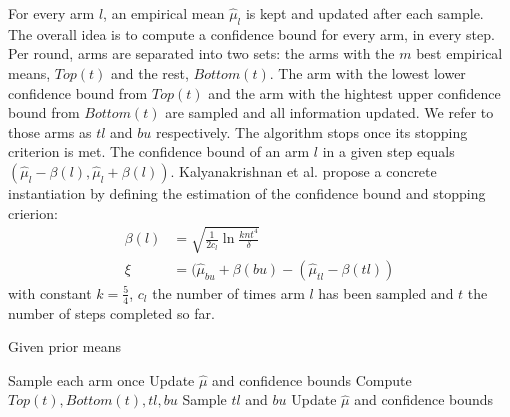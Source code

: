 For every arm $l$, an empirical mean $\hat{\mu}_l$ is kept and updated after
each sample. The overall idea is to compute a confidence bound for every arm, in
every step. Per round, arms are separated into two sets: the arms with the $m$
best empirical means, $Top(t)$ and the rest, $Bottom(t)$. The arm with the
lowest lower confidence bound from $Top(t)$ and the arm with the hightest upper
confidence bound from $Bottom(t)$ are sampled and all information updated. We
refer to those arms as $tl$ and $bu$ respectively. The algorithm stops once
its stopping criterion is met. The confidence bound of an arm $l$ in a given
step equals $(\hat{\mu}_l - \beta(l), \hat{\mu}_l + \beta(l))$.
Kalyanakrishnan et al. \cite{DBLP:conf/icml/KalyanakrishnanTAS12} propose a
concrete instantiation by defining the estimation of the confidence bound and
stopping crierion:
\begin{align}
  \beta(l) &= \sqrt{\frac{1}{2c_l}\ln\frac{knt^4}{\delta}} \\
  \xi &= (\hat{\mu}_{bu} + \beta(bu) - (\hat{\mu}_{tl} - \beta(tl))
\end{align}
with constant $k=\frac{5}{4}$, $c_l$ the number of times arm $l$ has been
sampled and $t$ the number of steps completed so far.
\begin{algorithm}[H]
    \caption{Given prior means}
    \label{alg:LUCB}
  \begin{algorithmic}
    \State Sample each arm once
    \State Update $\hat{\mu}$ and confidence bounds
    \Repeat
      \State Compute $Top(t), Bottom(t), tl, bu$
      \State Sample $tl$ and $bu$
      \State Update $\hat{\mu}$ and confidence bounds
    \Until{$\xi < \epsilon$}
  \end{algorithmic}
\end{algorithm}
